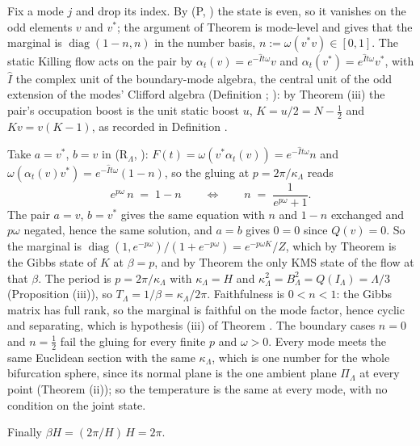 Fix a mode $j$ and drop its index. By (P, ) the state is even, so it vanishes on the odd elements $v$ and $v^{*}$; the argument of Theorem  is mode-level and gives that the marginal is $\operatorname{diag}(1 - n, n)$ in the number basis, $n := \omega(v^{*}v) \in [0,1]$. The static Killing flow acts on the pair by $\alpha_{t}(v) = e^{-\hat{I}t\omega}v$ and $\alpha_{t}(v^{*}) = e^{\hat{I}t\omega}v^{*}$, with $\hat{I}$ the complex unit of the boundary-mode algebra, the central unit of the odd extension of the modes' Clifford algebra (Definition ; ): by Theorem (iii) the pair's occupation boost is the unit static boost $u$, $K = u/2 = N - \tfrac12$ and $Kv = v(K - 1)$, as recorded in Definition .

Take $a = v^{*}$, $b = v$ in (R$_{\Lambda}$, ): $F(t) = \omega(v^{*}\alpha_{t}(v)) = e^{-\hat{I}t\omega}n$ and $\omega(\alpha_{t}(v)v^{*}) = e^{-\hat{I}t\omega}(1 - n)$, so the gluing at $p = 2\pi/\kappa_{\Lambda}$ reads
\[
e^{p\omega}\,n \;=\; 1 - n \qquad\Longleftrightarrow\qquad n \;=\; \frac{1}{e^{p\omega} + 1} .
\]
The pair $a = v$, $b = v^{*}$ gives the same equation with $n$ and $1 - n$ exchanged and $p\omega$ negated, hence the same solution, and $a = b$ gives $0 = 0$ since $Q(v) = 0$. So the marginal is $\operatorname{diag}(1, e^{-p\omega})/(1 + e^{-p\omega}) = e^{-p\omega K}/Z$, which by Theorem  is the Gibbs state of $K$ at $\beta = p$, and by Theorem  the only KMS state of the flow at that $\beta$. The period is $p = 2\pi/\kappa_{\Lambda}$ with $\kappa_{\Lambda} = H$ and $\kappa_{\Lambda}^{2} = B_{\Lambda}^{2} = Q(I_{\Lambda}) = \Lambda/3$ (Proposition (iii)), so $T_{\Lambda} = 1/\beta = \kappa_{\Lambda}/2\pi$. Faithfulness is $0 < n < 1$: the Gibbs matrix has full rank, so the marginal is faithful on the mode factor, hence cyclic and separating, which is hypothesis (iii) of Theorem . The boundary cases $n = 0$ and $n = \tfrac12$ fail the gluing for every finite $p$ and $\omega > 0$. Every mode meets the same Euclidean section with the same $\kappa_{\Lambda}$, which is one number for the whole bifurcation sphere, since its normal plane is the one ambient plane $\Pi_{\Lambda}$ at every point (Theorem (ii)); so the temperature is the same at every mode, with no condition on the joint state.

Finally $\beta H = (2\pi/H)\,H = 2\pi$.
